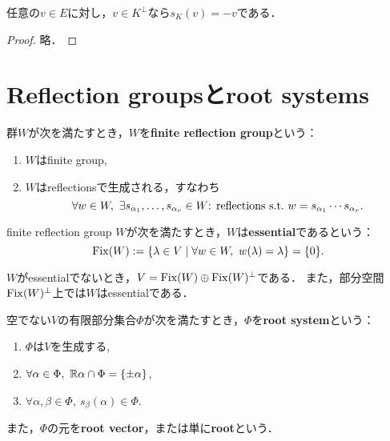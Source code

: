 \begin{theorem}
  \label{thm:reflection_mem_subspace_orthogonalComplement_eq_neg}
  \leanok
  任意の$v \in E$に対し，$v \in K^\perp$なら$s_K(v) = -v$である．
\end{theorem}

\begin{proof}
  \leanok
  略．
\end{proof}

\section{Reflection groupsとroot systems}
\begin{definition}
  \label{defi:FiniteReflectionGroup}
  \leanok
  群$W$が次を満たすとき，$W$を\textbf{finite reflection group}という：
  \begin{enumerate}[label=(\roman*)]
    \item $W$はfinite group,
    \item $W$はreflectionsで生成される，すなわち
    \begin{equation}
      \forall w \in W,\ \exists s_{\alpha_1}, \ldots, s_{\alpha_r} \in W \textrm{: reflections} \ \text{s.t.}\  w = s_{\alpha_1} \cdots s_{\alpha_r}.
    \end{equation}
  \end{enumerate}
\end{definition}

\begin{definition}
  finite reflection group $W$が次を満たすとき，$W$は\textbf{essential}であるという：
  \begin{equation}
    \operatorname{Fix}(W) := \left\lbrace \lambda \in V \mathrel{} \middle| \mathrel{} \forall w \in W,\ w(\lambda) = \lambda \right\rbrace = \{0\}.
  \end{equation}
\end{definition}

\begin{remark}
  $W$がessentialでないとき，$V = \operatorname{Fix}(W) \oplus \operatorname{Fix}(W)^\perp$である．
  また，部分空間$\operatorname{Fix}(W)^\perp$上では$W$はessentialである．
\end{remark}

\begin{definition}
  空でない$V$の有限部分集合$\Phi$が次を満たすとき，$\Phi$を\textbf{root system}という：
  \begin{enumerate}[label=(\roman*)]
    \item $\Phi$は$V$を生成する, \label{defi:root_gen}
    \item $\forall \alpha \in \Phi,\ \mathbb{R} \alpha \cap \Phi = \{\pm \alpha\}$, \label{defi:root_self}
    \item $\forall \alpha, \beta \in \Phi,\ s_\beta(\alpha) \in \Phi$. \label{defi:root_ref_closed}
  \end{enumerate}
  また，$\Phi$の元を\textbf{root vector}，または単に\textbf{root}という．
\end{definition}

